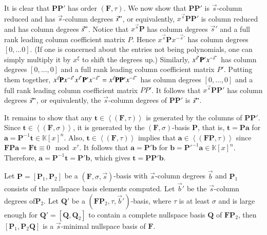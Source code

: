 \begin{pf}
It is clear that $\mathbf{P}\mathbf{P}'$ has order $(\mathbf{F},\tau)$.
We now show that $\mathbf{P}\mathbf{P}'$ is $\vec{s}$-column reduced
and has $\vec{s}$-column degrees $\vec{s}"$, or equivalently, $x^{\vec{s}}\mathbf{P}\mathbf{P}'$
is column reduced and has column degrees $\vec{s}"$. Notice that
$x^{\vec{s}}\mathbf{P}$ has column degrees $\vec{s}'$ and a full
rank leading column coefficient matrix $P$. Hence $x^{\vec{s}}\mathbf{P}x^{-\vec{s}'}$
has column degrees $\left[0,\dots0\right]$. (If one is concerned
about the entries not being polynomials, one can simply multiply it
by $x^{\xi}$ to shift the degrees up.) Similarly, $x^{\vec{s}'}\mathbf{P}'x^{-\vec{s}"}$
has column degrees $[0,\dots,0]$ and a full rank leading column coefficient
matrix $P'$. Putting them together, $x^{\vec{s}}\mathbf{P}x^{-\vec{s}'}x^{\vec{s}'}\mathbf{P}'x^{-\vec{s}"}=x^{\vec{s}}\mathbf{P}\mathbf{P}'x^{-\vec{s}"}$
has column degrees $[0,\dots,0]$ and a full rank leading column coefficient
matrix $PP'$. It follows that $x^{\vec{s}}\mathbf{P}\mathbf{P}'$
has column degrees $\vec{s}"$, or equivalently, the $\vec{s}$-column
degrees of $\mathbf{PP}'$ is $\vec{s}"$.

It remains to show that any $\mathbf{t}\in\left\langle \left(\mathbf{F},\tau\right)\right\rangle $
is generated by the columns of $\mathbf{PP}'$. Since $\mathbf{t}\in\left\langle \left(\mathbf{F},\sigma\right)\right\rangle $,
it is generated by the $\left(\mathbf{F},\sigma\right)$-basis $\mathbf{P}$,
that is, $\mathbf{t}=\mathbf{P}\mathbf{a}$ for $\mathbf{a}=\mathbf{P}^{-1}\mathbf{t}\in\mathbb{K}\left[x\right]^{n}$.
Also, $\mathbf{t}\in\left\langle \left(\mathbf{F},\tau\right)\right\rangle $
implies that $\mathbf{a}\in\left\langle \left(\mathbf{FP},\tau\right)\right\rangle $
since $\mathbf{F}\mathbf{P}\mathbf{a}=\mathbf{F}\mathbf{t}\equiv0\mod x^{\tau}$.
It follows that $\mathbf{a}=\mathbf{P}'\mathbf{b}$ for $\mathbf{b}=\mathbf{P}'^{-1}\mathbf{a}\in\mathbb{K}\left[x\right]^{n}$.
Therefore, $\mathbf{a}=\mathbf{P}^{-1}\mathbf{t}=\mathbf{P}'\mathbf{b}$,
which gives $\mathbf{t}=\mathbf{P}\mathbf{P}'\mathbf{b}$.\end{pf}
\begin{lem}
\label{lem:continueComputingNullspaceBasisByColumns}Let $\mathbf{P}=\left[\mathbf{P}_{1},\mathbf{P}_{2}\right]$
be a $\left(\mathbf{F},\sigma,\vec{s}\right)$-basis with $\vec{s}$-column
degrees $\vec{b}$ and $\mathbf{P}_{1}$ consists of the nullspace
basis elements computed. Let $\vec{b}'$ be the $\vec{s}$-column
degrees of$\mathbf{P}_{2}$. Let $\mathbf{Q}'$ be a $\left(\mathbf{F}\mathbf{P}_{2},\tau,\vec{b}'\right)$-basis,
where $\tau$ is at least $\sigma$ and is large enough for $\mathbf{Q}'=\left[\mathbf{Q},\mathbf{Q}_{2}\right]$
to contain a complete nullspace basis $\mathbf{Q}$ of $\mathbf{F}\mathbf{P}_{2}$,
then $\left[\mathbf{P}_{1},\mathbf{P}_{2}\mathbf{Q}\right]$ is a
$\vec{s}$-minimal nullspace basis of $\mathbf{F}$.\end{lem}
